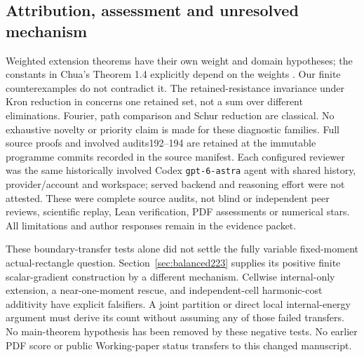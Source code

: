\subsection{Attribution, assessment and unresolved mechanism}
Weighted extension theorems have their own weight and domain hypotheses;
the constants in Chua's Theorem 1.4 explicitly depend on the weights
\cite{bd:chua}. Our finite counterexamples do not contradict it.
The retained-resistance invariance under Kron reduction in
\cite{bd:kron} concerns one retained set, not a sum over different
eliminations. Fourier, path comparison and Schur reduction are classical.
No exhaustive novelty or priority claim is made for these diagnostic
families. Full source proofs and involved audits192--194 are retained at
the immutable programme commits recorded in the source manifest. Each
configured reviewer was the same historically involved Codex
\texttt{gpt-6-astra} agent with shared history, provider/account and
workspace; served backend and reasoning effort were not attested. These
were complete source audits, not blind or independent peer reviews,
scientific replay, Lean verification, PDF assessments or numerical stars.
All limitations and author responses remain in the evidence packet.

These boundary-transfer tests alone did not settle the fully variable
fixed-moment actual-rectangle question. Section~\ref{sec:balanced223}
supplies its positive finite scalar-gradient construction by a different mechanism. Cellwise internal-only extension, a near-one-moment rescue, and
independent-cell harmonic-cost additivity have explicit falsifiers.
A joint partition or direct local internal-energy argument must derive
its count without assuming any of those failed transfers. No main-theorem
hypothesis has been removed by these negative tests. No earlier PDF score
or public Working-paper status transfers to this changed manuscript.
